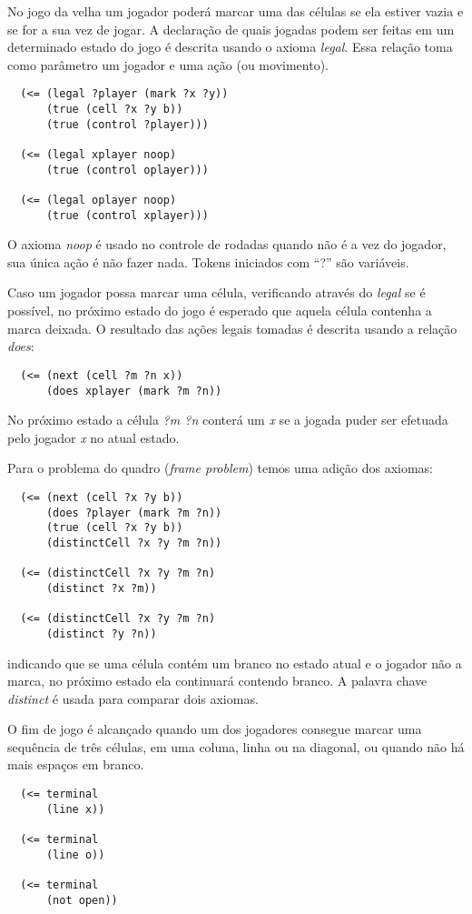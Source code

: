 No jogo da velha um jogador poderá marcar uma das células se ela estiver vazia e
se for a sua vez de jogar. A declaração de quais jogadas podem ser feitas em um
determinado estado do jogo é descrita usando o axioma {\it legal}. Essa relação
toma como parâmetro um jogador e uma ação (ou movimento).
\begin{verbatim}
  (<= (legal ?player (mark ?x ?y))
      (true (cell ?x ?y b))
      (true (control ?player)))
 
  (<= (legal xplayer noop)
      (true (control oplayer)))
 
  (<= (legal oplayer noop)
      (true (control xplayer)))
\end{verbatim}
O axioma {\it noop} é usado no controle de rodadas quando não é a vez do
jogador, sua única ação é não fazer nada. Tokens iniciados com ``?'' são
variáveis.
 
 
Caso um jogador possa marcar uma célula, verificando através do {\it legal} se é
possível, no próximo estado do jogo é esperado que aquela célula contenha a
marca deixada. O resultado das ações legais tomadas é descrita usando a relação
{\it does}:
\begin{verbatim}
  (<= (next (cell ?m ?n x))
      (does xplayer (mark ?m ?n))
\end{verbatim}
No próximo estado a célula {\it ?m ?n} conterá um {\it x} se a jogada puder ser
efetuada pelo jogador {\it x} no atual estado.
 
Para o problema do quadro ({\it frame problem}) temos uma adição dos axiomas:
\begin{verbatim}
  (<= (next (cell ?x ?y b))
      (does ?player (mark ?m ?n))
      (true (cell ?x ?y b))
      (distinctCell ?x ?y ?m ?n))
 
  (<= (distinctCell ?x ?y ?m ?n)
      (distinct ?x ?m))
 
  (<= (distinctCell ?x ?y ?m ?n)
      (distinct ?y ?n))
\end{verbatim}
indicando que se uma célula contém um branco no estado atual e o jogador não a
marca, no próximo estado ela continuará contendo branco. A palavra chave {\it
  distinct}
é usada para comparar dois axiomas.
 
O fim de jogo é alcançado quando um dos jogadores consegue marcar uma sequência
de três células, em uma coluna, linha ou na diagonal, ou quando não há mais
espaços em branco.
\begin{verbatim}
  (<= terminal
      (line x))
 
  (<= terminal
      (line o))
 
  (<= terminal
      (not open))
\end{verbatim}
 
